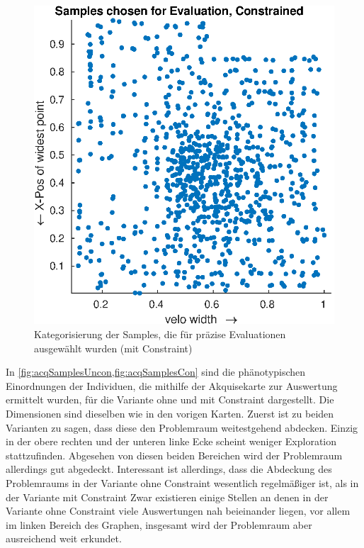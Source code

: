 \begin{figure}[h]
\begin{minipage}{0.45\textwidth}
		\includegraphics[width=1\linewidth]{bilder/6pt1000Samples/acqSamplesCon}
		\caption{Kategorisierung der Samples, die für präzise Evaluationen ausgewählt wurden (mit Constraint)}
		\label{fig:acqSamplesCon}
	\end{minipage}
\end{figure}

In \cref{fig:acqSamplesUncon,fig:acqSamplesCon} sind die phänotypischen Einordnungen der Individuen, die mithilfe der Akquisekarte zur Auswertung ermittelt wurden, für die Variante ohne und mit Constraint dargestellt.
Die Dimensionen sind dieselben wie in den vorigen Karten.
Zuerst ist zu beiden Varianten zu sagen, dass diese den Problemraum weitestgehend abdecken.
Einzig in der obere rechten und der unteren linke Ecke scheint weniger Exploration stattzufinden.
Abgesehen von diesen beiden Bereichen wird der Problemraum allerdings gut abgedeckt.
Interessant ist allerdings, dass die Abdeckung des Problemraums in der Variante ohne Constraint wesentlich regelmäßiger ist, als in der Variante mit Constraint
Zwar existieren einige Stellen an denen in der Variante ohne Constraint viele Auswertungen nah beieinander liegen, vor allem im linken Bereich des Graphen, insgesamt wird der Problemraum aber ausreichend weit erkundet.

